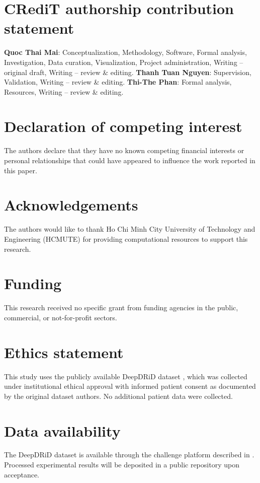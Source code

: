 \documentclass[final,5p,times,twocolumn,authoryear]{elsarticle}
\theoremstyle{plain}
\theoremstyle{remark}
\begin{document}

\section*{CRediT authorship contribution statement}
\textbf{Quoc Thai Mai}: Conceptualization, Methodology, Software,
Formal analysis, Investigation, Data curation, Visualization,
Project administration, Writing -- original draft,
Writing -- review \& editing.
\textbf{Thanh Tuan Nguyen}: Supervision, Validation,
Writing -- review \& editing.
\textbf{Thi-The Phan}: Formal analysis, Resources,
Writing -- review \& editing.

\section*{Declaration of competing interest}
The authors declare that they have no known competing financial interests
or personal relationships that could have appeared to influence the work
reported in this paper.

\section*{Acknowledgements}
The authors would like to thank Ho Chi Minh City University of Technology and Engineering (HCMUTE) for providing computational resources to support this research.

\section*{Funding}
This research received no specific grant from funding agencies in the
public, commercial, or not-for-profit sectors.

\section*{Ethics statement}
This study uses the publicly available DeepDRiD dataset
\citep{Liu2022deepdrid}, which was collected under institutional ethical
approval with informed patient consent as documented by the original
dataset authors. No additional patient data were collected.

\section*{Data availability}
The DeepDRiD dataset is available through the challenge platform
described in \citet{Liu2022deepdrid}. Processed experimental results
will be deposited in a public repository upon acceptance.
\end{document}
